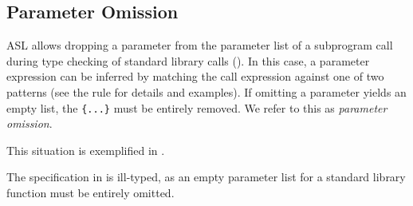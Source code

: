 \subsection{Parameter Omission\label{sec:ParameterOmission}}

ASL allows dropping a parameter from the parameter list of a subprogram call
during type checking of standard library calls ().
In this case, a parameter expression can be inferred by matching the call expression
against one of two patterns (see the rule for details and examples).
If omitting a parameter yields an empty list, the \verb|{...}| must be entirely removed.
We refer to this as \emph{parameter omission}.

This situation is exemplified in .

The specification in  is ill-typed,
as an empty parameter list for a standard library function must be entirely omitted.


